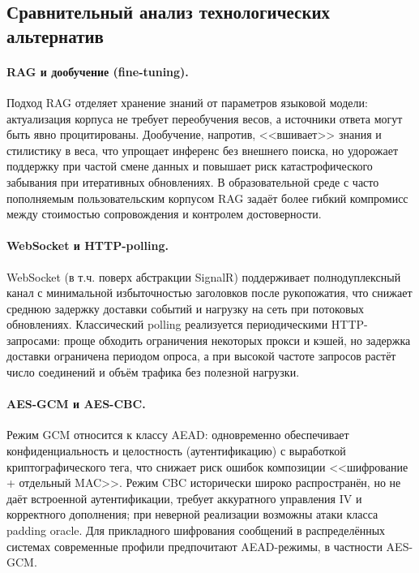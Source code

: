 \documentclass{article}
\begin{document}
\subsection{Сравнительный анализ технологических альтернатив}
\label{subsec:tech-compare-alt}

\paragraph{RAG и дообучение (fine-tuning).}
Подход RAG отделяет хранение знаний от параметров языковой модели: актуализация корпуса не требует переобучения весов, а источники ответа могут быть явно процитированы. Дообучение, напротив, <<вшивает>> знания и стилистику в веса, что упрощает инференс без внешнего поиска, но удорожает поддержку при частой смене данных и повышает риск катастрофического забывания при итеративных обновлениях. В образовательной среде с часто пополняемым пользовательским корпусом RAG задаёт более гибкий компромисс между стоимостью сопровождения и контролем достоверности.

\paragraph{WebSocket и HTTP-polling.}
WebSocket (в т.ч. поверх абстракции SignalR) поддерживает полнодуплексный канал с минимальной избыточностью заголовков после рукопожатия, что снижает среднюю задержку доставки событий и нагрузку на сеть при потоковых обновлениях. Классический polling реализуется периодическими HTTP-запросами: проще обходить ограничения некоторых прокси и кэшей, но задержка доставки ограничена периодом опроса, а при высокой частоте запросов растёт число соединений и объём трафика без полезной нагрузки.

\paragraph{AES-GCM и AES-CBC.}
Режим GCM относится к классу AEAD: одновременно обеспечивает конфиденциальность и целостность (аутентификацию) с выработкой криптографического тега, что снижает риск ошибок композиции <<шифрование + отдельный MAC>>. Режим CBC исторически широко распространён, но не даёт встроенной аутентификации, требует аккуратного управления IV и корректного дополнения; при неверной реализации возможны атаки класса padding oracle. Для прикладного шифрования сообщений в распределённых системах современные профили предпочитают AEAD-режимы, в частности AES-GCM.
\end{document}
